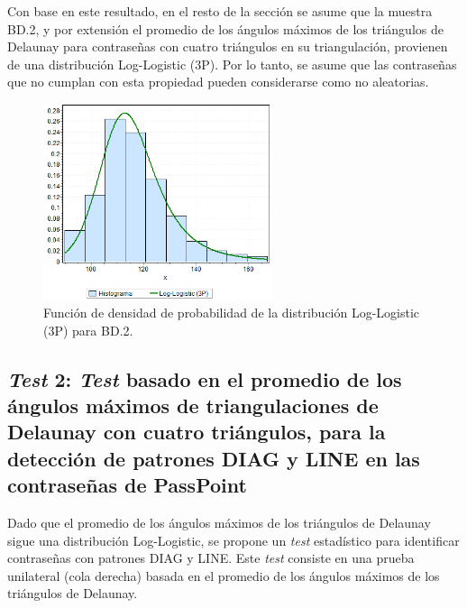 \documentclass[12pt]{report}
\begin{document}
Con base en este resultado, en el resto de la sección se asume que la muestra BD.2, y por extensión el promedio de los ángulos máximos de los triángulos de Delaunay para contraseñas con cuatro triángulos en su triangulación, provienen de una distribución Log-Logistic (3P). Por lo tanto, se asume que las contraseñas que no cumplan con esta propiedad pueden considerarse como no aleatorias.
 
\begin{figure}[ht]
	\centering
	
	\includegraphics[width=0.6\textwidth]{4td_fdp.png}
	\caption{Función de densidad de probabilidad de la  distribución Log-Logistic (3P) para BD.2.}
	\label{4TD_FDP}
\end{figure}
\newpage

\subsection{\textit{Test} 2: \textit{Test} basado en el promedio de los ángulos máximos de triangulaciones de Delaunay con cuatro triángulos, para la detección de patrones DIAG y LINE en las contraseñas de PassPoint}
\label{sec:2.2}

Dado que el promedio de los ángulos máximos de los triángulos de Delaunay sigue una distribución Log-Logistic, se propone un \textit{test} estadístico para identificar contraseñas con patrones DIAG y LINE. Este \textit{test} consiste en una prueba unilateral (cola derecha) basada en el promedio de los ángulos máximos de los triángulos de Delaunay.
\end{document}
